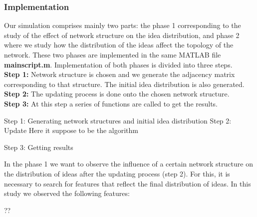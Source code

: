 \documentclass{beamer}
\begin{document}
%
\begin{frame}
\frametitle{Implementation}
Our simulation comprises mainly two parts: the phase 1 corresponding to the study  of the effect of network structure on the idea distribution, and phase 2 where we study how the distribution of the ideas affect the topology of the network. These two phases are implemented in the same MATLAB file \textbf{mainscript.m}. Implementation of both phases is divided into three steps. 
\\

\noindent \textbf{Step 1:} Network structure is chosen and we generate the adjacency matrix corresponding to that structure. The initial idea distribution is also generated.\\
\textbf{Step 2:} The updating process is done onto the chosen network structure.\\
\textbf{Step 3:} At this step a series of functions are called to get the results.
\end{frame}
%
\begin{frame}
{Step 1: Generating network structures and initial idea distribution}
{Step 2: Update}                
\alert{Here it suppose to be the algorithm}

\end{frame}
%
\begin{frame}
{Step 3: Getting results}

In the phase 1 we want to observe the influence of a certain network structure  on the distribution of ideas after the updating process (step 2). For this, it is necessary to search for features that reflect the final distribution of ideas. In this study we observed the following features:

\alert{??}

\end{frame}
%
\end{document}
